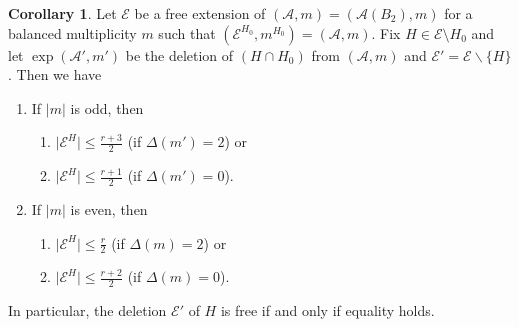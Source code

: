 \documentclass[12pt]{amsart}
\theoremstyle{definition}
\newtheorem{corollary}[theorem]{Corollary}
\theoremstyle{remark}
\newcommand\CA{{\mathscr A}}
\newcommand\CE{{\mathscr E}}
\begin{document}
\begin{corollary}\label{corollary: upper bound for restriction hyperplanes}
    Let $\CE$ be a free extension of $(\CA,m)=(\CA(B_2),m)$ for a balanced multiplicity $m$ such that $(\CE^{H_0},m^{H_0})=(\CA,m)$. Fix $H\in\CE\setminus{H_0}$ and let $\exp(\CA',m')$ be the deletion of $(H\cap H_0)$ from $(\CA,m)$ and $\CE'=\CE\backslash\{H\}$. Then we have
    \begin{enumerate}
        \item If $\vert m\vert$ is odd, then
            \begin{enumerate}
                \item $\vert \CE^{H}\vert\leq \frac{r+3}{2}$ (if $\Delta(m')=2$) or
                \item $\vert \CE^{H}\vert\leq \frac{r+1}{2}$ (if $\Delta(m')=0$).
            \end{enumerate}
        \item If $\vert m \vert$ is even, then 
        \begin{enumerate}
            \item $\vert\CE^{H}\vert\leq \frac{r}{2}$ (if $\Delta(m)=2$) or 
            \item $\vert \CE^{H}\vert\leq \frac{r+2}{2}$ (if $\Delta(m)=0$).
        \end{enumerate} 
    \end{enumerate}
    In particular, the deletion $\CE'$ of $H$ is free if and only if equality holds.
\end{corollary}
\end{document}
